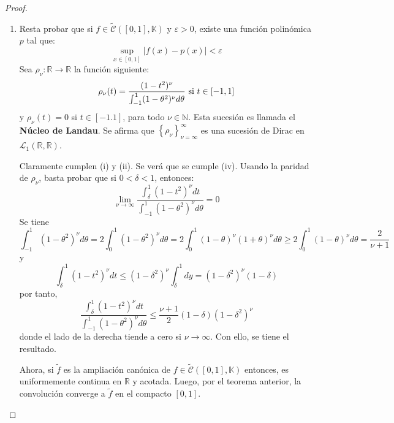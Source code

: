 \documentclass[12pt]{report}
\theoremstyle{largebreak}
\newcommand\cf[3]{\ensuremath{#1:#2\rightarrow#3}}
\newcommand\abs[1]{\ensuremath{\big|#1\big|}}
\begin{document}
\begin{proof}
\begin{enumerate}
            \item Resta probar que si $f\in\widetilde{\mathcal{C}}([0,1],\mathbb{K})$ y $\varepsilon>0$, existe una función polinómica $p$ tal que:
            \begin{equation*}
                \sup_{x\in[0,1]}\abs{f(x)-p(x)}<\varepsilon
            \end{equation*}
            Sea $\cf{\rho_\nu}{\mathbb{R}}{\mathbb{R}}$ la función siguiente:
            \begin{equation*}
                \rho_\nu(t)=\frac{(1-t^2)^\nu}{\int_{-1}^1(1-\theta^2)^\nu d\theta}\textup{ si }t\in[-1,1]
            \end{equation*}
            y $\rho_\nu(t)=0$ si $t\in[-1.1]$, para todo $\nu\in\mathbb{N}$. Esta sucesión es llamada el \textbf{Núcleo de Landau}.
            Se afirma que $\left\{\rho_\nu\right\}_{\nu=\infty}^\infty$ es una sucesión de Dirac en $\mathcal{L}_1(\mathbb{R},\mathbb{R})$.
            
            Claramente cumplen (i) y (ii). Se verá que se cumple (iv). Usando la paridad de $\rho_\nu$, basta probar que si $0<\delta<1$, entonces:
            \begin{equation*}
                \lim_{\nu\rightarrow\infty}\frac{\int_\delta^1(1-t^2)^\nu dt}{\int_{-1}^1(1-\theta^2)^\nu d\theta}=0
            \end{equation*}
            Se tiene
            \begin{equation*}
                \int_{-1}^1(1-\theta^2)^\nu d\theta=2\int_0^1(1-\theta^2)^\nu d\theta=2\int_0^1(1-\theta)^\nu(1+\theta)^\nu d\theta\geq2\int_0^1(1-\theta)^\nu d\theta=\frac{2}{\nu+1}
            \end{equation*}
            y
            \begin{equation*}
                \int_\delta^1(1-t^2)^\nu dt\leq(1-\delta^2)^\nu\int_\delta^1dy=(1-\delta^2)^\nu(1-\delta)
            \end{equation*}
            por tanto,
            \begin{equation*}
                \frac{\int_\delta^1(1-t^2)^\nu dt}{\int_{-1}^1(1-\theta^2)^\nu d\theta}\leq\frac{\nu+1}{2}(1-\delta)(1-\delta^2)^\nu
            \end{equation*}
            donde el lado de la derecha tiende a cero si $\nu\rightarrow\infty$. Con ello, se tiene el resultado.

            Ahora, si $\widetilde{f}$ es la ampliación canónica de $f\in\widetilde{\mathcal{C}}([0,1],\mathbb{K})$ entonces, es uniformemente continua en $\mathbb{R}$ y acotada. Luego, por el teorema anterior, la convolución converge a $\widetilde{f}$ en el compacto $[0,1]$.


\end{enumerate}
\end{proof}
\end{document}
